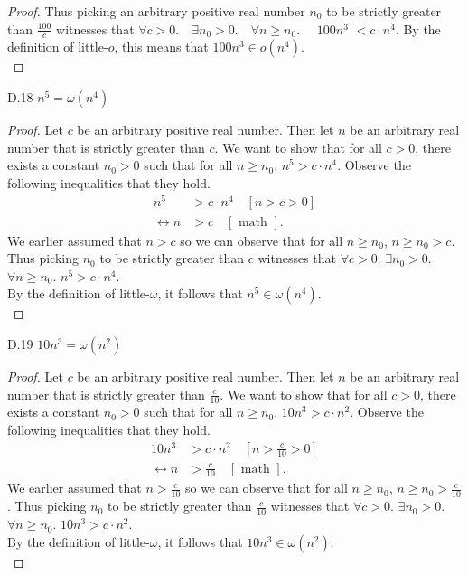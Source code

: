 \documentclass[10pt]{article}
\begin{document}
\begin{enumerate}[label={}]
\begin{proof}
              Thus picking an arbitrary positive real number $n_0$ to be strictly greater than $\frac{100}{c}$ witnesses that $\forall c>0 . \quad \exists n_0>0 . \quad \forall n \geq n_0 . \quad$ $100 n^3$ $< c \cdot n^4$. By the definition of little-$o$, this means that $100n^3 \in o\left(n^4\right)$.\\
          \end{proof}
          D.18 $n^5=\omega\left(n^4\right)$
          \begin{proof}
              Let $c$ be an arbitrary positive real number. Then let $n$ be an arbitrary real number that is strictly greater than $c$.
              We want to show that for all $c>0$, there exists a constant $n_0 > 0$ such that for all $n\geq n_0$, $n^5>c \cdot n^4$.
              Observe the following inequalities that they hold.
              $$
                  \begin{aligned}
                      n^5                   & >c \cdot n^4 \quad {\left[n>c>0\right] } \\
                      \longleftrightarrow n & >c \quad[\text { math }].
                  \end{aligned}
              $$
              We earlier assumed that $n>c$ so we can observe that for all $n\geq n_0$, $n\geq n_0>c$.
              Thus picking $n_0$ to be strictly greater than $c$ witnesses that $\forall c>0$. $\exists n_0>0$. $\forall n \geq n_0$. $n^5>c \cdot n^4$.\\
              By the definition of little-$\omega$, it follows that $n^5 \in \omega\left(n^4\right)$.\\
          \end{proof}
          \newpage

          D.19 $10 n^3=\omega\left(n^2\right)$
          \begin{proof}
              Let $c$ be an arbitrary positive real number.
              Then let $n$ be an arbitrary real number that is strictly greater than $\frac{c}{10}$.
              We want to show that for all $c>0$, there exists a constant $n_0 > 0$ such that for all $n\geq n_0$, $10 n^3>c \cdot n^2$.
              Observe the following inequalities that they hold.
              $$
                  \begin{aligned}
                      10 n^3                & >c \cdot n^2 \quad {\left[n>\frac{c}{10}>0\right] } \\
                      \longleftrightarrow n & >\frac{c}{10} \quad[\text { math }].
                  \end{aligned}
              $$
              We earlier assumed that $n>\frac{c}{10}$ so we can observe that for all $n\geq n_0$, $n\geq n_0>\frac{c}{10}$.
              Thus picking $n_0$ to be strictly greater than $\frac{c}{10}$ witnesses that $\forall c>0$. $\exists n_0>0$. $\forall n \geq n_0$. $10 n^3>c \cdot n^2$.\\
              By the definition of little-$\omega$, it follows that $10 n^3 \in \omega\left(n^2\right)$.\\
          \end{proof}


\end{enumerate}
\end{document}
